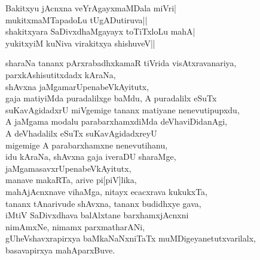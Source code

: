\begin{entry}
\begin{shl}
Bakitxyu jAcnxna veYrAgayxmaMDala miVri|\\
mukitxmaMTapadoLu tUgADutiruva||\\
shakitxyara SaDivxdhaMgayayx toTiTxloLu mahA|\\
yukitxyiM kuNiva virakitxya shishuveV||
\end{shl}
\end{entry}

\begin{entry}
\begin{shl}
sharaNa tananx pArxrabadhxkamaR tiVrida visAtxravanariya,\\
parxkAshisutitxdadx kAraNa,\\
shAvxna jaMgamarUpenabeVkAyitutx,\\
gaja matiyiMda puradalilxge baMdu, A puradalilx eSuTx\\
suKavAgidadxrU miVgemige tananx matiyane nenevutipupxdu,\\
A jaMgama modalu parabarxhamxdiMda deVhaviDidanAgi,\\
A deVhadalilx eSuTx suKavAgidadxreyU\\
migemige A parabarxhamxne nenevutihanu,\\
idu kAraNa, shAvxna gaja iveraDU sharaMge,\\
jaMgamasavxrUpenabeVkAyitutx,\\
manave makaRTa, arive pi[piV]lika,\\
mahAjAcnxnave vihaMga, nitayx ecacxrava kukukxTa,\\
tananx tAnarivude shAvxna, tananx budidhxye gava,\\
iMtiV SaDivxdhava balAlxtane barxhamxjAcnxni\\
nimAmxNe, nimamx parxmatharANi,\\
gUheVshavxrapirxya baMkaNaNxniTaTx muMDigeyanetutxvarilalx,\\
basavapirxya mahAparxBuve.
\end{shl}
\end{entry}

